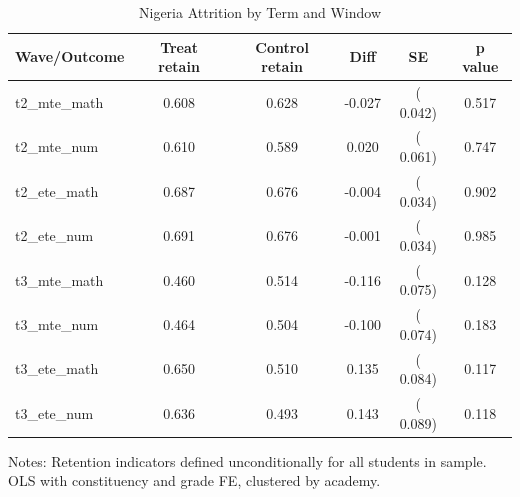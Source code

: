 \begin{table}[!htbp]
\centering
\caption{Nigeria Attrition by Term and Window}
\label{tab:ng_attrition}
\begin{threeparttable}
\begin{tabular}[t]{lccccc}
\toprule
Wave/Outcome & Treat retain & Control retain & Diff & SE & p value \\
\midrule
t2\_mte\_math &   0.608 &   0.628 &  -0.027 & (  0.042) & 0.517 \\
t2\_mte\_num &   0.610 &   0.589 &   0.020 & (  0.061) & 0.747 \\
t2\_ete\_math &   0.687 &   0.676 &  -0.004 & (  0.034) & 0.902 \\
t2\_ete\_num &   0.691 &   0.676 &  -0.001 & (  0.034) & 0.985 \\
t3\_mte\_math &   0.460 &   0.514 &  -0.116 & (  0.075) & 0.128 \\
t3\_mte\_num &   0.464 &   0.504 &  -0.100 & (  0.074) & 0.183 \\
t3\_ete\_math &   0.650 &   0.510 &   0.135 & (  0.084) & 0.117 \\
t3\_ete\_num &   0.636 &   0.493 &   0.143 & (  0.089) & 0.118 \\
\bottomrule
\end{tabular}
\begin{tablenotes}[para]
\item Notes: Retention indicators defined unconditionally for all students in sample. 
OLS with constituency and grade FE, clustered by academy.
\end{tablenotes}
\end{threeparttable}
\end{table}
